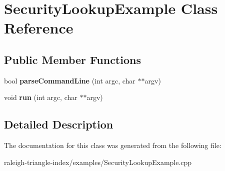 \section{Security\+Lookup\+Example Class Reference}
\label{class_security_lookup_example}
\subsection*{Public Member Functions}
\begin{DoxyCompactItemize}
\item 
bool {\bfseries parse\+Command\+Line} (int argc, char $\ast$$\ast$argv)\label{class_security_lookup_example_af7a74a7740205051c3b93b9be334cd70}

\item 
void {\bfseries run} (int argc, char $\ast$$\ast$argv)\label{class_security_lookup_example_a142338f4caa64ddeaaa805776c969554}

\end{DoxyCompactItemize}


\subsection{Detailed Description}


The documentation for this class was generated from the following file\+:\begin{DoxyCompactItemize}
\item 
raleigh-\/triangle-\/index/examples/Security\+Lookup\+Example.\+cpp\end{DoxyCompactItemize}
